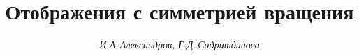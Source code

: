 

 




 


\newcommand{\const}{\operatorname{const}} 


\newcommand{\sign}{\operatorname{sign}} 


\newcommand{\ctg}{\operatorname{ctg}} 


\renewcommand{\baselinestretch}{0.96}


\newcommand{\tts}[1]{} 


 




  


\setcounter{page}{3} 












\author{\it И.А.\,Александров, Г.Д.\,Садритдинова} 




\title{ Отображения с симметрией вращения} 


 


\date{} 




 


\pagestyle{plain} %


 


